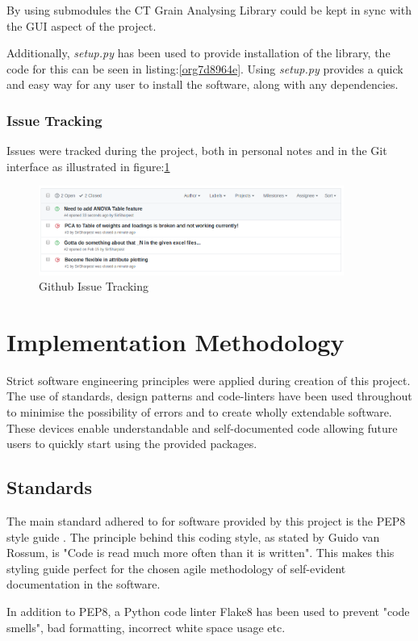 \documentclass[11pt]{report}
\begin{document}
By using submodules the CT Grain Analysing Library could be kept in sync with the GUI aspect of the project.

Additionally, \emph{setup.py} has been used to provide installation of the library, the code for this can be seen in listing:\ref{org7d8964e}. Using \emph{setup.py} provides a quick and easy way for any user to install the software, along with any dependencies.

\subsubsection{Issue Tracking}
\label{sec:org780e90a}
Issues were tracked during the project, both in personal notes and in the Git interface as illustrated in figure:\ref{fig:orgb7fab8a}
\begin{figure}[htbp]
\centering
\includegraphics[width=10cm]{./images/github.png}
\caption{\label{fig:orgb7fab8a}
Github Issue Tracking}
\end{figure}

\section{Implementation Methodology}
\label{sec:org5203ce6}
Strict software engineering principles were applied during creation of this project. The use of standards, design patterns and code-linters have been used throughout to minimise the possibility of errors and to create wholly extendable software. These devices enable understandable and self-documented code allowing future users to quickly start using the provided packages.
\subsection{Standards}
\label{sec:orgfdcf543}
The main standard adhered to for software provided by this project is the PEP8 style guide \cite{VanRossum}. The principle behind this coding style, as stated by Guido van Rossum, is "Code is read much more often than it is written". This makes this styling guide perfect for the chosen agile methodology of self-evident documentation in the software.

In addition to PEP8, a Python code linter Flake8 has been used to prevent "code smells", bad formatting, incorrect white space usage etc.
\end{document}
